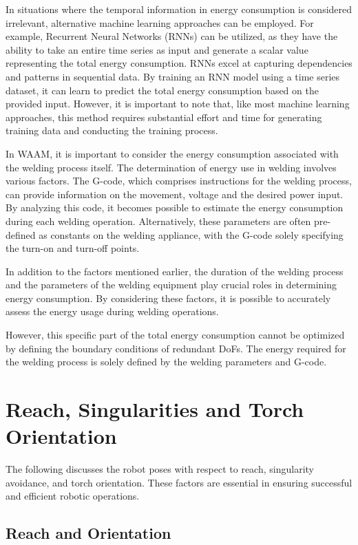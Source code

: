 In situations where the temporal information in energy consumption is considered irrelevant, alternative machine learning approaches can be employed. For example, Recurrent Neural Networks (RNNs) can be utilized, as they have the ability to take an entire time series as input and generate a scalar value representing the total energy consumption. RNNs excel at capturing dependencies and patterns in sequential data. By training an RNN model using a time series dataset, it can learn to predict the total energy consumption based on the provided input. However, it is important to note that, like most machine learning approaches, this method requires substantial effort and time for generating training data and conducting the training process.

In WAAM, it is important to consider the energy consumption associated with the welding process itself. The determination of energy use in welding involves various factors. The G-code, which comprises instructions for the welding process, can provide information on the movement, voltage and the desired power input. By analyzing this code, it becomes possible to estimate the energy consumption during each welding operation. Alternatively, these parameters are often pre-defined as constants on the welding appliance, with the G-code solely specifying the turn-on and turn-off points.

In addition to the factors mentioned earlier, the duration of the welding process and the parameters of the welding equipment play crucial roles in determining energy consumption. By considering these factors, it is possible to accurately assess the energy usage during welding operations.

However, this specific part of the total energy consumption cannot be optimized by defining the boundary conditions of redundant DoFs. The energy required for the welding process is solely defined by the welding parameters and G-code.


\section{Reach, Singularities and Torch Orientation}
The following discusses the robot poses with respect to reach, singularity avoidance, and torch orientation. These factors are essential in ensuring successful and efficient robotic operations.
\subsection{Reach and Orientation}\label{RO}

